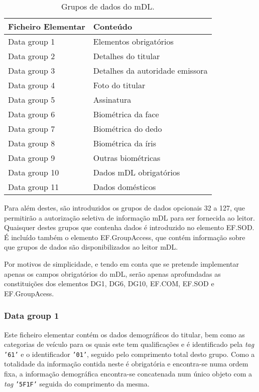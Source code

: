 \begin{table}[H]
\centering
\caption{Grupos de dados do mDL.}
\label{table:grupos_dados}
\vspace{0.2cm}
\begin{tabular}{|l|l|}
\hline
\rowcolor[HTML]{EFEFEF}
Ficheiro Elementar & Conteúdo \\ \hline
Data group 1 & Elementos obrigatórios \\ \hline
Data group 2 & Detalhes do titular \\ \hline
Data group 3 & Detalhes da autoridade emissora \\ \hline
Data group 4 & Foto do titular \\ \hline
Data group 5 & Assinatura \\ \hline
Data group 6 & Biométrica da face \\ \hline
Data group 7 & Biométrica do dedo \\ \hline
Data group 8 & Biométrica da íris \\ \hline
Data group 9 & Outras biométricas \\ \hline
Data group 10 & Dados mDL obrigatórios \\ \hline
Data group 11 & Dados domésticos \\ \hline
\end{tabular}
\end{table}

Para além destes, são introduzidos os grupos de dados opcionais 32 a 127, que permitirão a autorização seletiva de informação mDL para ser fornecida ao leitor. Quaisquer destes grupos que contenha dados é introduzido no elemento EF.SOD. É incluído também o elemento EF.GroupAccess, que contém informação sobre que grupos de dados são disponibilizados ao leitor mDL.

Por motivos de simplicidade, e tendo em conta que se pretende implementar apenas os campos obrigatórios do mDL, serão apenas aprofundadas as constituições dos elementos DG1, DG6, DG10, EF.COM, EF.SOD e EF.GroupAcess.

\subsubsection{Data group 1}

Este ficheiro elementar contém os dados demográficos do titular, bem como as categorias de veículo para os quais este tem qualificações e é identificado pela \textit{tag} \texttt{'61'} e o identificador \texttt{'01'}, seguido pelo comprimento total desto grupo. Como a totalidade da informação contida neste é obrigatória e encontra-se numa ordem fixa, a informação demográfica encontra-se concatenada num único objeto com a \textit{tag} \texttt{'5F1F'} seguida do comprimento da mesma. 

